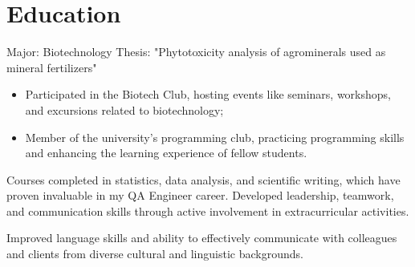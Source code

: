 \documentclass[11pt,a4paper,sans]{moderncv}
\begin{document}
\section{Education}
{}{Major: Biotechnology\newline{}
Thesis: "Phytotoxicity analysis of agrominerals used as mineral fertilizers"
\begin{itemize}
\item Participated in the Biotech Club, hosting events like seminars, workshops, and excursions related to biotechnology;
\item Member of the university's programming club, practicing programming skills and enhancing the learning experience of fellow students.
\end{itemize}
Courses completed in statistics, data analysis, and scientific writing, which have proven invaluable in my QA Engineer career. Developed leadership, teamwork, and communication skills through active involvement in extracurricular activities.}

{Improved language skills and ability to effectively communicate with colleagues and clients from diverse cultural and linguistic backgrounds.}
\end{document}
